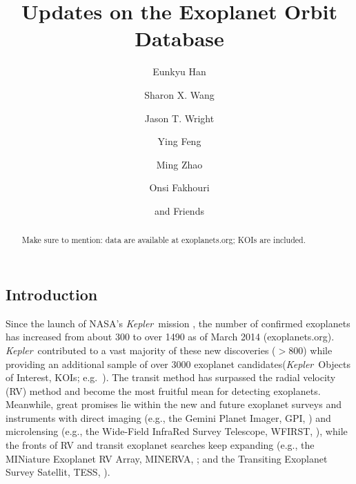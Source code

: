 \documentclass[11pt,preprint]{aastex}
\def\kepler{\textit{Kepler}}
\begin{document}
\begin{CJK*}{UTF8}{gbsn}

\title{Updates on the Exoplanet Orbit Database}

\author{Eunkyu Han}
\author{Sharon X. Wang}
\author{Jason T. Wright}
\author{Ying Feng}
\author{Ming Zhao}
\author{Onsi Fakhouri}
\author{and Friends}



\begin{abstract}
Make sure to mention: data are available at exoplanets.org; KOIs are included.
\end{abstract}  

\section{Introduction}\label{sec:intro}

Since the launch of NASA's \kepler\ mission \citep{Borucki2010}, the
number of confirmed exoplanets has increased from about 300 to over
1490 as of March 2014 (exoplanets.org). \kepler\ contributed to a vast
majority of these new discoveries ($> 800$) while providing an
additional sample of over 3000 exoplanet candidates(\kepler\ Objects
of Interest, KOIs; e.g.~\citealt{Batalha2013}). The transit method has
surpassed the radial velocity (RV) method and become the most fruitful
mean for detecting exoplanets. Meanwhile, great promises lie within
the new and future exoplanet surveys and instruments with direct
imaging (e.g., the Gemini Planet Imager, GPI,
\citealt{Macintosh2014}) and microlensing (e.g., the Wide-Field
InfraRed Survey Telescope, WFIRST, \citealt{Green2012}), while the
fronts of RV and transit exoplanet searches keep expanding (e.g., the
MINiature Exoplanet RV Array, MINERVA, \citealt{Wright2014}; and the
Transiting Exoplanet Survey Satellit, TESS, \citealt{Ricker2010}).


\end{CJK*}
\end{document}
